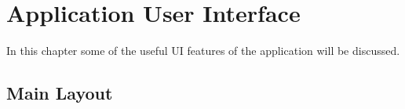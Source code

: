\chapter{Application User Interface }

\label{Chapter6_appUI} 

In this chapter some of the useful UI features of the application will be discussed. 

\section{Main Layout}

